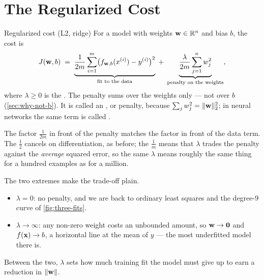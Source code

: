 \section{The Regularized Cost}
\label{sec:regularized-cost}

\begin{defbox}{Regularized cost (L2, ridge)}
For a model with weights $\mathbf{w} \in \mathbb{R}^{n}$ and bias $b$, the
 cost is
\[
  J(\mathbf{w},b) \;=\;
  \underbrace{\frac{1}{2m}\sum_{i=1}^{m}\bigl(f_{\mathbf{w},b}(x^{(i)}) - y^{(i)}\bigr)^2}_{\text{fit to the data}}
  \;+\;
  \underbrace{\frac{\lambda}{2m}\sum_{j=1}^{n} w_j^2}_{\text{penalty on the weights}} ,
\]
where $\lambda \ge 0$ is the . The penalty sums
over the weights only --- not over $b$ (\cref{sec:why-not-b}). It is called an
, or  penalty, because $\sum_j w_j^2 =
\|\mathbf{w}\|_2^2$; in neural networks the same term is called .
\end{defbox}

The factor $\frac{1}{2m}$ in front of the penalty matches the factor in front of
the data term. The $\frac12$ cancels on differentiation, as before; the
$\frac1m$ means that $\lambda$ trades the penalty against the \emph{average}
squared error, so the same $\lambda$ means roughly the same thing for a hundred
examples as for a million.

The two extremes make the trade-off plain.

\begin{itemize}
  \item $\lambda = 0$: no penalty, and we are back to ordinary least squares and
        the degree-$9$ curve of \cref{fig:three-fits}.
  \item $\lambda \to \infty$: any non-zero weight costs an unbounded amount, so
        $\mathbf{w} \to \mathbf{0}$ and $f(\mathbf{x}) \to b$, a horizontal line at the mean
        of $y$ --- the most underfitted model there is.
\end{itemize}

Between the two, $\lambda$ sets how much training fit the model must give up to
earn a reduction in $\|\mathbf{w}\|$.

